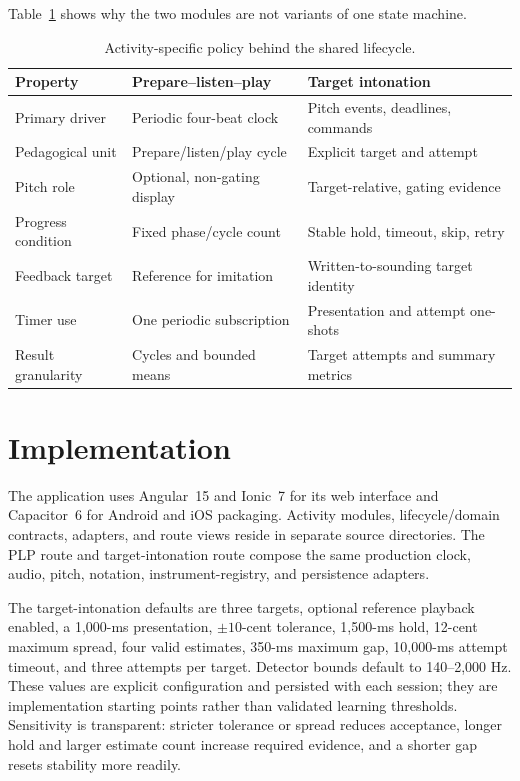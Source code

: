 \documentclass[runningheads]{llncs}
\begin{document}
Table~\ref{tab:activities} shows why the two modules are not variants of one
state machine.

\begin{table}[t]
\caption{Activity-specific policy behind the shared lifecycle.}
\label{tab:activities}
\centering
\small
\begin{tabularx}{\textwidth}{@{}p{}XX@{}}
\toprule
Property & Prepare--listen--play & Target intonation\\
\midrule
Primary driver & Periodic four-beat clock & Pitch events, deadlines, commands\\
Pedagogical unit & Prepare/listen/play cycle & Explicit target and attempt\\
Pitch role & Optional, non-gating display & Target-relative, gating evidence\\
Progress condition & Fixed phase/cycle count & Stable hold, timeout, skip, retry\\
Feedback target & Reference for imitation & Written-to-sounding target identity\\
Timer use & One periodic subscription & Presentation and attempt one-shots\\
Result granularity & Cycles and bounded means & Target attempts and summary metrics\\
\bottomrule
\end{tabularx}
\end{table}

\section{Implementation}\label{sec:implementation}

The application uses Angular~15 and Ionic~7 for its web interface and
Capacitor~6 for Android and iOS packaging. Activity modules, lifecycle/domain
contracts, adapters, and route views reside in separate source directories.
The PLP route and target-intonation route compose the same production clock,
audio, pitch, notation, instrument-registry, and persistence adapters.

The target-intonation defaults are three targets, optional reference playback
enabled, a 1,000-ms presentation, $\pm10$-cent tolerance, 1,500-ms hold,
12-cent maximum spread, four valid estimates, 350-ms maximum gap, 10,000-ms
attempt timeout, and three attempts per target. Detector bounds default to
140--2,000 Hz. These values are explicit configuration and persisted with each
session; they are implementation starting points rather than validated
learning thresholds. Sensitivity is transparent: stricter tolerance or spread
reduces acceptance, longer hold and larger estimate count increase required
evidence, and a shorter gap resets stability more readily.
\end{document}
